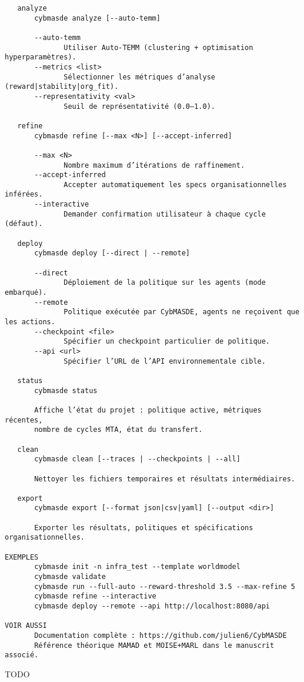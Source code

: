 \begin{verbatim}
   analyze
       cybmasde analyze [--auto-temm]

       --auto-temm
              Utiliser Auto-TEMM (clustering + optimisation hyperparamètres).
       --metrics <list>
              Sélectionner les métriques d’analyse (reward|stability|org_fit).
       --representativity <val>
              Seuil de représentativité (0.0–1.0).

   refine
       cybmasde refine [--max <N>] [--accept-inferred]

       --max <N>
              Nombre maximum d’itérations de raffinement.
       --accept-inferred
              Accepter automatiquement les specs organisationnelles inférées.
       --interactive
              Demander confirmation utilisateur à chaque cycle (défaut).

   deploy
       cybmasde deploy [--direct | --remote]

       --direct
              Déploiement de la politique sur les agents (mode embarqué).
       --remote
              Politique exécutée par CybMASDE, agents ne reçoivent que les actions.
       --checkpoint <file>
              Spécifier un checkpoint particulier de politique.
       --api <url>
              Spécifier l’URL de l’API environnementale cible.

   status
       cybmasde status

       Affiche l’état du projet : politique active, métriques récentes,
       nombre de cycles MTA, état du transfert.

   clean
       cybmasde clean [--traces | --checkpoints | --all]

       Nettoyer les fichiers temporaires et résultats intermédiaires.

   export
       cybmasde export [--format json|csv|yaml] [--output <dir>]

       Exporter les résultats, politiques et spécifications organisationnelles.

EXEMPLES
       cybmasde init -n infra_test --template worldmodel
       cybmasde validate
       cybmasde run --full-auto --reward-threshold 3.5 --max-refine 5
       cybmasde refine --interactive
       cybmasde deploy --remote --api http://localhost:8080/api

VOIR AUSSI
       Documentation complète : https://github.com/julien6/CybMASDE
       Référence théorique MAMAD et MOISE+MARL dans le manuscrit associé.
\end{verbatim}

TODO